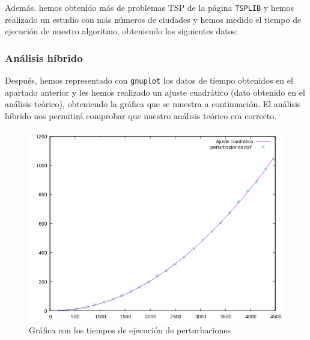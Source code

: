 \documentclass[10pt,a4paper]{article}
\begin{document}
Además. hemos obtenido más de problemas TSP de la página \texttt{TSPLIB} y hemos realizado un estudio con más números de ciudades y hemos medido el tiempo de ejecución de nuestro algoritmo, obteniendo los siguientes datos:

 \begin{table}[h!]
 	\centering
 	\footnotesize
 	\caption{Experiencia empírica de perturbaciones}
 \end{table}
 
 \subsubsection*{Análisis híbrido}
 
Después, hemos representado con \texttt{gnuplot} los datos de tiempo obtenidos en el apartado anterior y les hemos realizado un ajuste cuadrático (dato obtenido en el análisis teórico), obteniendo la gráfica que se muestra a continuación. El análisis híbrido nos permitirá comprobar que nuestro análisis teórico era correcto.

\begin{figure}[h!]
 	\centering
 	\includegraphics[scale=0.55]{./Images/perturbaciones.png}
 	\caption{Gráfica con los tiempos de ejecución de perturbaciones}
 \end{figure}
 
\end{document}
